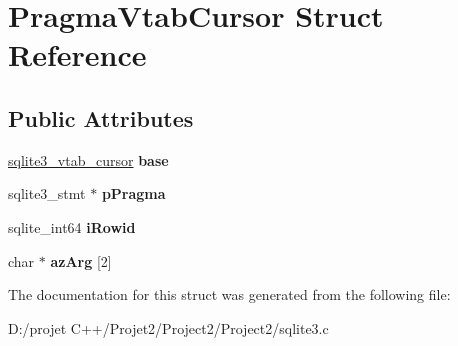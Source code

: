 \hypertarget{struct_pragma_vtab_cursor}{}\section{Pragma\+Vtab\+Cursor Struct Reference}
\label{struct_pragma_vtab_cursor}
\subsection*{Public Attributes}
\begin{DoxyCompactItemize}
\item 
\mbox{\label{struct_pragma_vtab_cursor_a40a25fbcbcd1fc6bd43cd7efeafdcd37}} 
\mbox{\hyperlink{structsqlite3__vtab__cursor}{sqlite3\+\_\+vtab\+\_\+cursor}} {\bfseries base}
\item 
\mbox{\label{struct_pragma_vtab_cursor_a17a78a26edc2774f649b530fa1f96b94}} 
sqlite3\+\_\+stmt $\ast$ {\bfseries p\+Pragma}
\item 
\mbox{\label{struct_pragma_vtab_cursor_a00362797d6825ea8ba623dfa9de693f3}} 
sqlite\+\_\+int64 {\bfseries i\+Rowid}
\item 
\mbox{\label{struct_pragma_vtab_cursor_ad2bece38661ab4a7522463275a237731}} 
char $\ast$ {\bfseries az\+Arg} \mbox{[}2\mbox{]}
\end{DoxyCompactItemize}


The documentation for this struct was generated from the following file\+:\begin{DoxyCompactItemize}
\item 
D\+:/projet C++/\+Projet2/\+Project2/\+Project2/sqlite3.\+c\end{DoxyCompactItemize}
